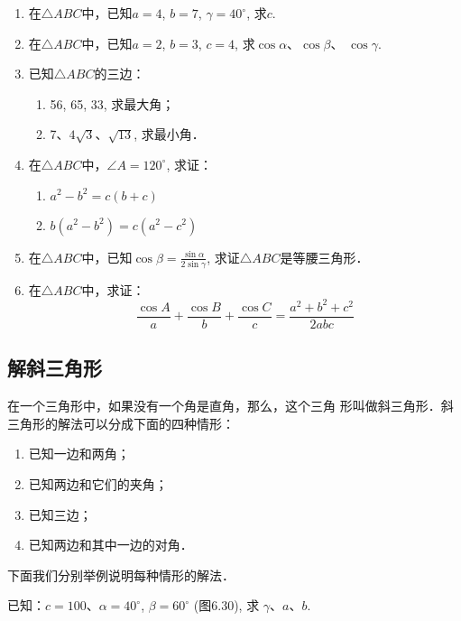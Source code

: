 \begin{ex}
\begin{enumerate}
    \item 在$\triangle ABC$中，已知$a=4$, $b=7$, $\gamma=40^{\circ}$, 求$c$.
    \item 在$\triangle ABC$中，已知$a=2$, $b=3$, $c=4$, 求$\cos\alpha$、$\cos\beta$、
    $\cos\gamma$.
    \item 已知$\triangle ABC$的三边：
\begin{enumerate}
    \item 56, 65, 33, 求最大角；
    \item 7、$4\sqrt{3}$、$\sqrt{13}$, 求最小角．
\end{enumerate}

    \item 在$\triangle ABC$中，$\angle A=120^{\circ}$, 求证：
\begin{enumerate}
    \item $a^2-b^2=c(b+c)$
    \item $ b(a^2-b^2)=c(a^2-c^2)$
\end{enumerate}

\item  在$\triangle ABC$中，已知$\cos\beta=\frac{\sin\alpha}{2\sin\gamma}$, 求证$\triangle ABC$是等腰三角形．
\item  在$\triangle ABC$中，求证：
\[\frac{\cos A}{a}+\frac{\cos B}{b}+\frac{\cos C}{c}=\frac{a^2+b^2+c^2}{2abc}\]
\end{enumerate}    
\end{ex}

\subsection{解斜三角形}
在一个三角形中，如果没有一个角是直角，那么，这个三角
形叫做斜三角形．斜三角形的解法可以分成下面的四种情形：
\begin{enumerate}
\item 已知一边和两角；
\item 已知两边和它们的夹角；
\item 已知三边；
\item 已知两边和其中一边的对角．
\end{enumerate}

下面我们分别举例说明每种情形的解法．
    
\begin{example}
    已知：$c=100$、$\alpha=40^{\circ}$, $\beta=60^{\circ}$ (图6.30), 求
$\gamma$、$a$、$b$.
\end{example}


